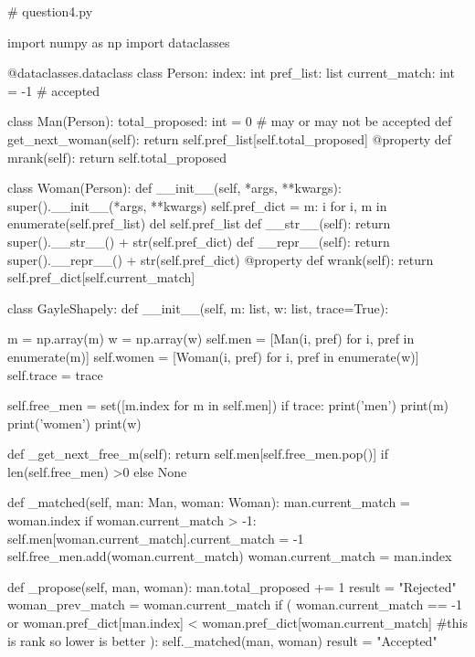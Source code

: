 \documentclass{homeworg}
\begin{document}
\begin{python}

# question4.py

import numpy as np
import dataclasses


@dataclasses.dataclass
class Person:
    index: int
    pref_list: list
    current_match: int = -1  # accepted

class Man(Person):
    total_proposed: int = 0  # may or may not be accepted
    def get_next_woman(self):
        return self.pref_list[self.total_proposed]
    @property
    def mrank(self):
        return self.total_proposed


class Woman(Person):
    def __init__(self, *args, **kwargs):
        super().__init__(*args, **kwargs)
        self.pref_dict = {m: i for i, m in enumerate(self.pref_list)}
        del self.pref_list
    def __str__(self):
        return super().__str__() + str(self.pref_dict)
    def __repr__(self):
        return super().__repr__() + str(self.pref_dict)
    @property
    def wrank(self):
        return self.pref_dict[self.current_match]


class GayleShapely:
    def __init__(self, m: list, w: list, trace=True):

        m = np.array(m)
        w = np.array(w)
        self.men = [Man(i, pref) for i, pref in enumerate(m)]
        self.women = [Woman(i, pref) for i, pref in enumerate(w)]
        self.trace = trace
        
        self.free_men = set([m.index for m in self.men])
        if trace:
            print('men')
            print(m)
            print('women')
            print(w)

    def _get_next_free_m(self):
        return self.men[self.free_men.pop()] if len(self.free_men) >0 else None

    def _matched(self, man: Man, woman: Woman):
        man.current_match = woman.index
        if woman.current_match > -1:
            self.men[woman.current_match].current_match = -1
            self.free_men.add(woman.current_match)
        woman.current_match = man.index

        


    def _propose(self, man, woman):
        man.total_proposed += 1
        result = "Rejected"
        woman_prev_match = woman.current_match
        if (
            woman.current_match == -1
            or woman.pref_dict[man.index] < woman.pref_dict[woman.current_match] #this is rank so lower is better
        ):
            self._matched(man, woman)
            result = "Accepted"


\end{python}
\end{document}
